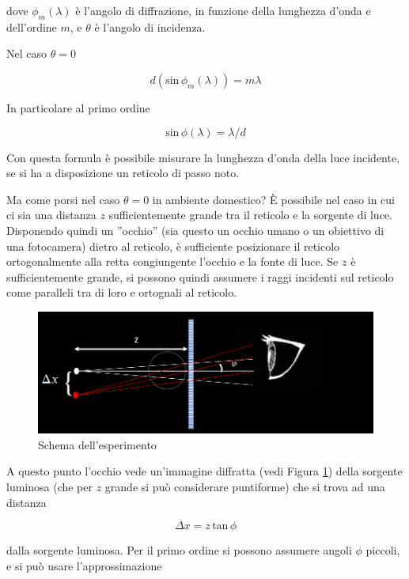 \documentclass{article}
\begin{document}
dove $\phi _m (\lambda)$ è l'angolo di diffrazione, in funzione della lunghezza d'onda e dell'ordine $m$, e $\theta$ è l'angolo di incidenza.

Nel caso $\theta = 0$

\begin{equation}
d(\textrm{sin} \, \phi_m (\lambda)) = m\lambda
\end{equation}

In particolare al primo ordine

\begin{equation}
\textrm{sin} \, \phi (\lambda) = \lambda/d
\end{equation}

Con questa formula è possibile misurare la lunghezza d'onda della luce incidente, se si ha a disposizione un reticolo di passo noto.

\vspace{5mm}

Ma come porsi nel caso $\theta = 0$ in ambiente domestico? È possibile nel caso in cui ci sia una distanza $z$ sufficientemente grande tra il reticolo e la sorgente di luce. Disponendo quindi un ''occhio'' (sia questo un occhio umano o un obiettivo di una fotocamera) dietro al reticolo, è sufficiente posizionare il reticolo ortogonalmente alla retta congiungente l'occhio e la fonte di luce. Se $z$ è sufficientemente grande, si possono quindi assumere i raggi incidenti sul reticolo come paralleli tra di loro e ortognali al reticolo.

\begin{figure}[h!]
  \centering
  \includegraphics[width=0.8\linewidth]{IM_schema_1}
  \caption{Schema dell'esperimento}
  \label{schema}
\end{figure}

A questo punto l'occhio vede un'immagine diffratta (vedi Figura \ref{schema}) della sorgente luminosa (che per $z$ grande si può considerare puntiforme) che si trova ad una distanza 

\[\Delta x = z\, \textrm{tan} \, \phi\]

dalla sorgente luminosa. Per il primo ordine si possono assumere angoli $\phi$ piccoli, e si può usare l'approssimazione
\end{document}
